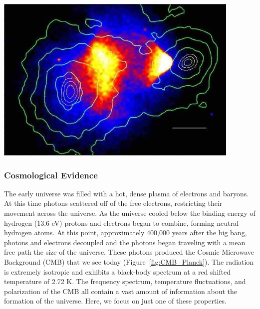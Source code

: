 \begin{center} \label{bulletcluster}
\includegraphics[scale=1]{bulletcluster.jpg}
\end{center}
 

\subsubsection{Cosmological Evidence}

The early universe was filled with a hot, dense plasma of electrons and baryons.  At this time photons scattered off of the free electrons, restricting their movement across the universe.  As the universe cooled below the binding energy of hydrogen (13.6 eV) protons and electrons began to combine, forming neutral hydrogen atoms.  At this point, approximately 400,000 years after the big bang,  photons and electrons decoupled and the photons began traveling with a mean free path the size of the universe.  These photons produced the Cosmic Microwave Background (CMB) that we see today (Figure~\ref{fig:CMB_Planck}).  The radiation is extremely isotropic and exhibits a black-body spectrum at a red shifted temperature of 2.72 K.  The frequency spectrum, temperature fluctuations, and polarization of the CMB all contain a vast amount of information about the formation of the universe.  Here, we focus on just one of these properties. 



